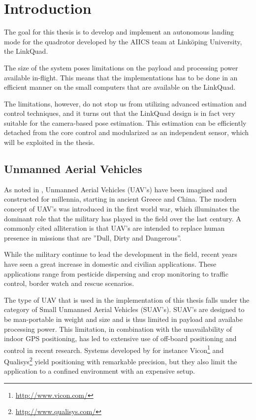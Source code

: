 \chapter{Introduction}
\label{cha:introduction}
    The goal for this thesis is to develop and implement an autonomous landing mode
    for the quadrotor developed by the AIICS team at Linköping University, the LinkQuad.

    The size of the system poses limitations on the payload and processing power
    available in-flight. This means that the implementations has to be done
    in an efficient manner on the small computers that are available on the LinkQuad.

    The limitations, however, do not stop us from utilizing advanced estimation
    and control techniques, and it turns out that the LinkQuad design is in fact
    very suitable for the camera-based pose estimation.
    This estimation can be efficiently detached from the core control
    and modularized as an independent sensor, which will be exploited in the
    thesis.

\section{Unmanned Aerial Vehicles}
    As noted in \citep{valavanis2007advances}, Unmanned Aerial Vehicles (UAV's)
    have been imagined and constructed for millennia, starting in ancient Greece and China.
    The modern concept of UAV's was introduced in the first world war, which
    illuminates the dominant role that the military has played in the field over the
    last century. A commonly cited alliteration is that UAV's are intended to replace
    human presence in missions that are ''Dull, Dirty and Dangerous''.

    While the military\citep{united2010u} continue to lead the development in the field, recent years
    have seen a great increase in domestic and civilian applications\citep{Wong_Bil_2006}.
    These applications range from pesticide dispersing and crop monitoring to
    traffic control, border watch and rescue scenarios\citep{Doherty_Rudol_2007}.

    The type of UAV that is used in the implementation of this thesis
    falls under the category of Small Unmanned Aerial Vehicles (SUAV's).
    SUAV's are designed to be man-portable in weight and size and is thus
    limited in payload and availabe processing power.
    This limitation, in combination with the unavailability of indoor GPS positioning,
    has led to extensive use of off-board positioning and control in recent research.
    Systems developed by for instance Vicon\footnote{\url{http://www.vicon.com/}} and
    Qualisys\footnote{\url{http://www.qualisys.com/}} yield positioning with
    remarkable precision, but they also limit the application to a confined
    environment with an expensive setup.

